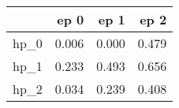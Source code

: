 \begin{tabular}{lrrr}
\toprule
{} &   ep 0 &   ep 1 &   ep 2 \\
\midrule
hp\_0 &  0.006 &  0.000 &  0.479 \\
hp\_1 &  0.233 &  0.493 &  0.656 \\
hp\_2 &  0.034 &  0.239 &  0.408 \\
\bottomrule
\end{tabular}
